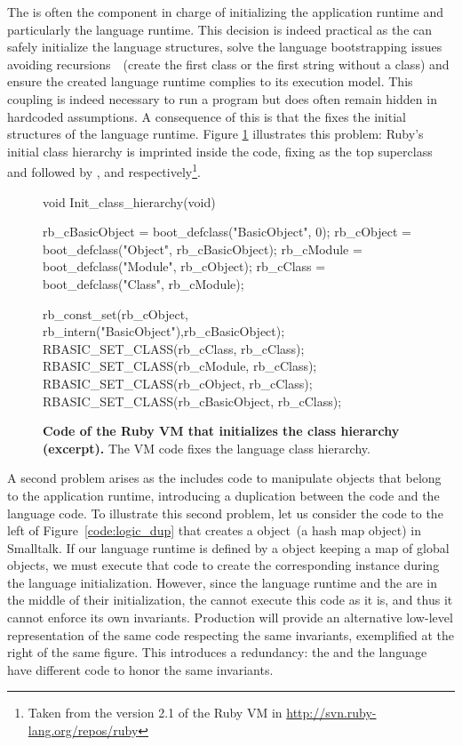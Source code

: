 The \VM is often the component in charge of initializing the application runtime and particularly the language runtime. This decision is indeed practical as the \VM can safely initialize the language structures, solve the language bootstrapping issues avoiding recursions~\cite{Kicz91a}~(\eg create the first class or the first string without a class) and ensure the created language runtime complies to its execution model. This coupling is indeed necessary to run a program but does often remain hidden in hardcoded assumptions. A consequence of this is that the \VM fixes the initial structures of the language runtime. Figure \ref{code:ruby_hierarchy} illustrates this problem: Ruby's initial class hierarchy is imprinted inside the \VM code, fixing  as the top superclass and followed by ,  and  respectively\footnote{Taken from the version 2.1 of the Ruby VM in \url{http://svn.ruby-lang.org/repos/ruby}}.

\begin{figure}[ht!]
\begin{code}
void Init_class_hierarchy(void) {
    rb_cBasicObject = boot_defclass("BasicObject", 0);
    rb_cObject = boot_defclass("Object", rb_cBasicObject);
    rb_cModule = boot_defclass("Module", rb_cObject);
    rb_cClass =  boot_defclass("Class",  rb_cModule);

    rb_const_set(rb_cObject, rb_intern("BasicObject"),rb_cBasicObject);
    RBASIC_SET_CLASS(rb_cClass, rb_cClass);
    RBASIC_SET_CLASS(rb_cModule, rb_cClass);
    RBASIC_SET_CLASS(rb_cObject, rb_cClass);
    RBASIC_SET_CLASS(rb_cBasicObject, rb_cClass);
}
\end{code}
\caption{\textbf{Code of the Ruby VM that initializes the class hierarchy (excerpt).} The VM code fixes the language class hierarchy.\label{code:ruby_hierarchy}}
\end{figure}

A second problem arises as the \VM includes code to manipulate objects that belong to the application runtime, introducing a duplication between the \VM code and the language code. 
To illustrate this second problem, let us consider the code to the left of Figure~\ref{code:logic_dup} that creates a  object~(a hash map object) in Smalltalk. If our language runtime is defined by a  object keeping \eg a map of global objects, we must execute that code to create the corresponding instance during the language initialization. However, since the language runtime and the \VM are in the middle of their initialization, the \VM cannot execute this code as it is, and thus it cannot enforce its own invariants. Production \VMs will provide an alternative low-level representation of the same code respecting the same invariants, exemplified at the right of the same figure. This introduces a redundancy: the \VM and the language have different code to honor the same invariants.

